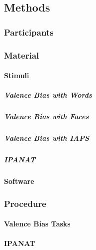 \documentclass[man]{apa6}
\let\oldparagraph\paragraph
\renewcommand{\paragraph}[1]{\oldparagraph{#1}\mbox{}}
\let\oldsubparagraph\subparagraph
\renewcommand{\subparagraph}[1]{\oldsubparagraph{#1}\mbox{}}
\begin{document}
\hypertarget{methods-1}{%
\subsection{Methods}\label{methods-1}}

\hypertarget{participants-1}{%
\subsubsection{Participants}\label{participants-1}}

\hypertarget{material-1}{%
\subsubsection{Material}\label{material-1}}

\hypertarget{stimuli-1}{%
\paragraph{Stimuli}\label{stimuli-1}}

\hypertarget{valence-bias-with-words}{%
\subparagraph{Valence Bias with Words}\label{valence-bias-with-words}}

\hypertarget{valence-bias-with-faces}{%
\subparagraph{Valence Bias with Faces}\label{valence-bias-with-faces}}

\hypertarget{valence-bias-with-iaps}{%
\subparagraph{Valence Bias with IAPS}\label{valence-bias-with-iaps}}

\hypertarget{ipanat}{%
\subparagraph{IPANAT}\label{ipanat}}

\hypertarget{software-1}{%
\paragraph{Software}\label{software-1}}

\hypertarget{procedure}{%
\subsubsection{Procedure}\label{procedure}}

\hypertarget{valence-bias-tasks}{%
\paragraph{Valence Bias Tasks}\label{valence-bias-tasks}}

\hypertarget{ipanat-1}{%
\paragraph{IPANAT}\label{ipanat-1}}
\end{document}
